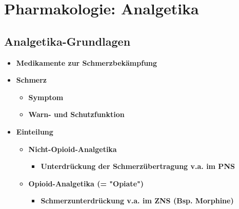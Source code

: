 \section{Pharmakologie: Analgetika}
\subsection{Analgetika-Grundlagen}
	\begin{itemize}
		\item \textbf{Medikamente zur Schmerzbekämpfung}
		\item \textbf{Schmerz}
			\begin{itemize}
				\item \textbf{Symptom}
				\item \textbf{Warn- und Schutzfunktion}
			\end{itemize}
		\item \textbf{Einteilung}
			\begin{itemize}
				\item \textbf{Nicht-Opioid-Analgetika}
					\begin{itemize}
						\item \textbf{Unterdrückung der Schmerzübertragung v.a. im PNS}
					\end{itemize}
				\item \textbf{Opioid-Analgetika (= "Opiate")}
					\begin{itemize}
						\item \textbf{Schmerzunterdrückung v.a. im ZNS (Bsp. Morphine)}
					\end{itemize}
			\end{itemize}
	\end{itemize}

